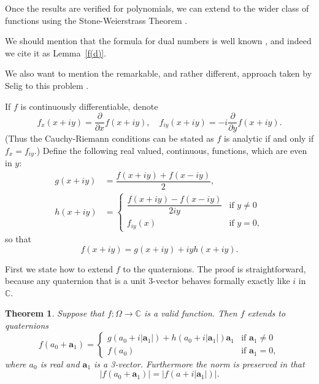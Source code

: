 \documentclass[12pt,reqno]{amsart}
\newtheorem{theorem}{Theorem}
\begin{document}
Once the results are verified for polynomials, we can extend to the wider class of functions using the Stone-Weierstrass Theorem \cite{rudin}.

We should mention that the formula for dual numbers is well known \cite{wiki-1}, and indeed we cite it as Lemma~\ref{f(d)}.

We also want to mention the remarkable, and rather different, approach taken by Selig  to this problem \cite{selig}.

If $f$ is continuously differentiable, denote
\begin{equation}
f_x(x+iy) = \dfrac{\partial}{\partial x} f(x+iy) , \quad
f_{iy}(x+iy) = -i\dfrac{\partial}{\partial y} f(x+iy) .
\end{equation}
(Thus the Cauchy-Riemann conditions can be stated as $f$ is analytic if and only if $f_x = f_{iy}$.)  Define the following real valued, continuous, functions, which are even in $y$:
\begin{align}
\label{g}
g(x+iy) &= \dfrac{f(x+iy) + f(x-iy)} 2, \\
\label{h}
h(x+iy) &= \begin{cases}
\dfrac{f(x+iy)-f(x-iy)}{2iy} &\text{if $y \ne 0$} \\
f_{iy} (x) &\text{if $y = 0$} ,
\end{cases}
\end{align}
so that
\begin{equation}
\label{f=g+iyh}
f(x+iy) = g(x+iy) + i y h(x+iy) .
\end{equation}

First we state how to extend $f$ to the quaternions.  The proof is straightforward, because any quaternion that is a unit 3-vector behaves formally exactly like $i$ in $\mathbb C$.

\begin{theorem}
\label{f(q)}
Suppose that $f:\Omega \to \mathbb C$ is a valid function.  Then $f$ extends to quaternions
\begin{equation}
f(a_0 + \bm a_1) = \begin{cases}
g(a_0+i|\bm a_1|) +h(a_0+i|\bm a_1|) \bm a_1 & \text{if $\bm a_1 \ne 0$} \\
f(a_0) & \text{if $\bm a_1 = 0$}, \end{cases}
\end{equation}
where $a_0$ is real and $\bm a_1$ is a 3-vector.  Furthermore the norm is preserved in that
\begin{equation}
| f(a_0 + \bm a_1) | = | f(a + i |\bm a_1|) | .
\end{equation}
\end{theorem}
\end{document}
